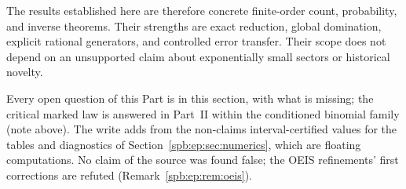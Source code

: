 The results established here are therefore concrete finite-order count,
probability, and inverse theorems. Their strengths are exact reduction,
global domination, explicit rational generators, and controlled error
transfer. Their scope does not depend on an unsupported claim about
exponentially small sectors or historical novelty.
\begin{writenote}
Every open question of this Part is in this section, with what is missing;
the critical marked law is answered in Part~II within the conditioned binomial
family (note above). The write adds from the non-claims interval-certified values for the
tables and diagnostics of Section~\ref{spb:ep:sec:numerics}, which are
floating computations. No claim of the
source was found false; the OEIS refinements' first corrections are refuted
(Remark~\ref{spb:ep:rem:oeis}).
\end{writenote}
